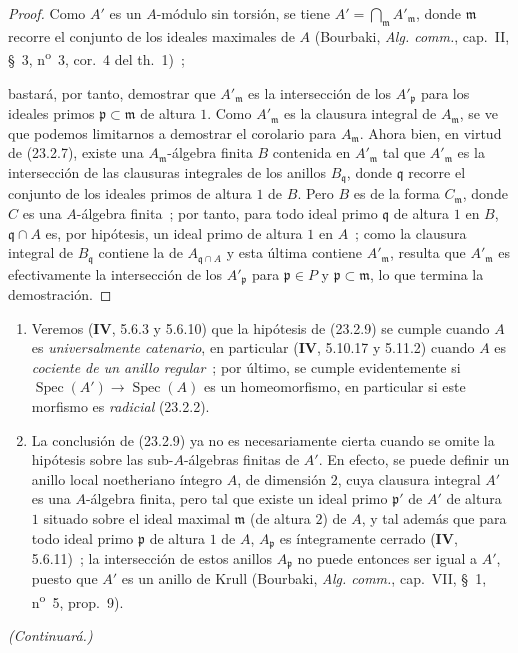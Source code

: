 \begin{proof}
Como $A'$ es un $A$-módulo sin torsión, se tiene
$A'=\bigcap_{\mathfrak m}A'_{\mathfrak m}$, donde $\mathfrak m$ recorre el conjunto de los ideales
maximales de $A$ (Bourbaki, \emph{Alg. comm.}, cap.~II, §~3,
n\textsuperscript{o}~3, cor.~4 del th.~1)~;


bastará, por tanto, demostrar que $A'_{\mathfrak m}$ es la intersección de los
$A'_{\mathfrak p}$ para los ideales primos $\mathfrak p\subset\mathfrak m$
de altura $1$. Como $A'_{\mathfrak m}$ es la clausura integral de
$A_{\mathfrak m}$, se ve que podemos limitarnos a demostrar el corolario para
$A_{\mathfrak m}$. Ahora bien, en virtud de (23.2.7), existe una
$A_{\mathfrak m}$-álgebra finita $B$ contenida en $A'_{\mathfrak m}$ tal
que $A'_{\mathfrak m}$ es la intersección de las clausuras integrales de los anillos
$B_{\mathfrak q}$, donde $\mathfrak q$ recorre el conjunto de los ideales primos de
altura $1$ de $B$. Pero $B$ es de la forma $C_{\mathfrak m}$, donde $C$ es
una $A$-álgebra finita~; por tanto, para todo ideal primo $\mathfrak q$ de altura
$1$ en $B$, $\mathfrak q\cap A$ es, por hipótesis, un ideal primo de
altura $1$ en $A$~; como la clausura integral de $B_{\mathfrak q}$
contiene la de $A_{\mathfrak q\cap A}$ y esta última contiene
$A'_{\mathfrak m}$, resulta que $A'_{\mathfrak m}$ es efectivamente
la intersección de los $A'_{\mathfrak p}$ para $\mathfrak p\in P$ y
$\mathfrak p\subset\mathfrak m$, lo que termina la demostración.
\end{proof}

\begin{remarks}[23.2.10]
\label{0.23.2.10-es}
\begin{enumerate}
  \item[(i)] Veremos (\textbf{IV}, 5.6.3 y 5.6.10) que la hipótesis de (23.2.9)
  se cumple cuando $A$ es \emph{universalmente catenario}, en particular
  (\textbf{IV}, 5.10.17 y 5.11.2) cuando $A$ es \emph{cociente de un anillo
  regular}~; por último, se cumple evidentemente si
  $\operatorname{Spec}(A')\to\operatorname{Spec}(A)$ es un homeomorfismo,
  en particular si este morfismo es \emph{radicial} (23.2.2).

  \item[(ii)] La conclusión de (23.2.9) ya no es necesariamente cierta
  cuando se omite la hipótesis sobre las sub-$A$-álgebras finitas de $A'$. En
  efecto, se puede definir un anillo local noetheriano íntegro $A$, de dimensión
  $2$, cuya clausura integral $A'$ es una $A$-álgebra finita, pero tal que
  existe un ideal primo $\mathfrak p'$ de $A'$ de altura $1$ situado sobre
  el ideal maximal $\mathfrak m$ (de altura $2$) de $A$, y tal además que
  para todo ideal primo $\mathfrak p$ de altura $1$ de $A$,
  $A_{\mathfrak p}$ es íntegramente cerrado (\textbf{IV}, 5.6.11)~; la intersección de
  estos anillos $A_{\mathfrak p}$ no puede entonces ser igual a $A'$, puesto que $A'$
  es un anillo de Krull (Bourbaki, \emph{Alg. comm.}, cap.~VII, §~1,
  n\textsuperscript{o}~5, prop.~9).
\end{enumerate}
\end{remarks}

\begin{flushright}
\emph{(Continuará.)}
\end{flushright}
